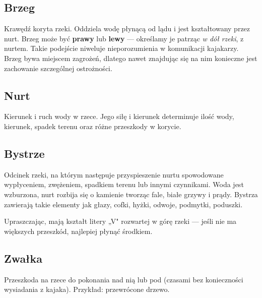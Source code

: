 \subsection{Brzeg}

Krawędź koryta rzeki. Oddziela wodę płynącą od lądu i jest kształtowany przez nurt. Brzeg może być \textbf{prawy} lub \textbf{lewy} — określamy je patrząc \emph{w dół rzeki},
z nurtem. Takie podejście niweluje nieporozumienia w komunikacji kajakarzy. Brzeg bywa miejscem zagrożeń, dlatego nawet znajdując się na nim konieczne jest zachowanie szczególnej ostrożności.

\subsection{Nurt}

Kierunek i ruch wody w rzece. Jego siłę i kierunek determinuje ilość wody, kierunek, spadek terenu oraz różne przeszkody w korycie.

\subsection{Bystrze}

Odcinek rzeki, na którym następuje przyspieszenie nurtu spowodowane wypłyceniem, zwężeniem, spadkiem terenu lub innymi czynnikami. Woda jest wzburzona, nurt rozbija się o kamienie tworząc fale, białe grzywy i prądy. Bystrza zawierają takie elementy jak głazy, cofki, hyżki, odwoje, podmytki, poduszki.

Upraszczając, mają kształt litery „V" rozwartej w górę rzeki — jeśli nie ma większych przeszkód, najlepiej płynąć środkiem.

\subsection{Zwałka}

Przeszkoda na rzece do pokonania nad nią lub pod (czasami bez konieczności wysiadania z kajaka). Przykład: przewrócone drzewo.


